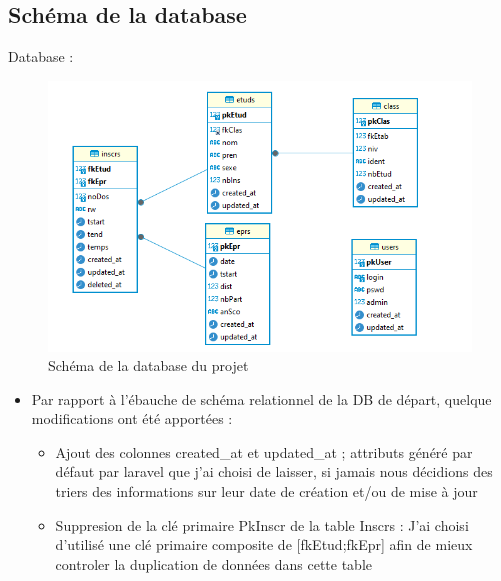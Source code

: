 \subsection{Schéma de la database}

Database : \\

\begin{figure}[h]
	\centering
	\includegraphics[width=15cm]{images/Database}
	\caption{Schéma de la database du projet}
\end{figure}

\begin{itemize}[label=$\bullet$]
	\item Par rapport à l'ébauche de schéma relationnel de la DB de départ, quelque modifications ont été apportées :
	\begin{itemize}[label=$\bullet$]
		\item Ajout des colonnes created\_at et updated\_at ; attributs généré par défaut par laravel que j'ai choisi de laisser, si jamais nous décidions des triers des informations sur leur date de création et/ou de mise à jour
		\item Suppresion de la clé primaire PkInscr de la table Inscrs : J'ai choisi d'utilisé une clé primaire composite de [fkEtud;fkEpr] afin de mieux controler la duplication de données dans cette table
	\end{itemize}
\end{itemize}